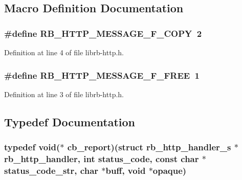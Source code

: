 \subsection{Macro Definition Documentation}
\hypertarget{librb-http_8h_a0ffdecd586e5dc8f1eeede6bac9bc19f}{
\subsubsection[{R\-B\-\_\-\-H\-T\-T\-P\-\_\-\-M\-E\-S\-S\-A\-G\-E\-\_\-\-F\-\_\-\-C\-O\-P\-Y}]{\setlength{\rightskip}{0pt plus 5cm}\#define R\-B\-\_\-\-H\-T\-T\-P\-\_\-\-M\-E\-S\-S\-A\-G\-E\-\_\-\-F\-\_\-\-C\-O\-P\-Y~2}}\label{librb-http_8h_a0ffdecd586e5dc8f1eeede6bac9bc19f}


Definition at line 4 of file librb-\/http.\-h.

\hypertarget{librb-http_8h_aef79f44f520e54cbedce1068fe324720}{
\subsubsection[{R\-B\-\_\-\-H\-T\-T\-P\-\_\-\-M\-E\-S\-S\-A\-G\-E\-\_\-\-F\-\_\-\-F\-R\-E\-E}]{\setlength{\rightskip}{0pt plus 5cm}\#define R\-B\-\_\-\-H\-T\-T\-P\-\_\-\-M\-E\-S\-S\-A\-G\-E\-\_\-\-F\-\_\-\-F\-R\-E\-E~1}}\label{librb-http_8h_aef79f44f520e54cbedce1068fe324720}


Definition at line 3 of file librb-\/http.\-h.



\subsection{Typedef Documentation}
\hypertarget{librb-http_8h_a04bb44224e2874cbf2df16042f2a4c53}{
\subsubsection[{cb\-\_\-report}]{\setlength{\rightskip}{0pt plus 5cm}typedef void($\ast$ cb\-\_\-report)(struct {\bf rb\-\_\-http\-\_\-handler\-\_\-s} $\ast${\bf rb\-\_\-http\-\_\-handler}, int status\-\_\-code, const char $\ast$status\-\_\-code\-\_\-str, char $\ast$buff, void $\ast$opaque)}}\label{librb-http_8h_a04bb44224e2874cbf2df16042f2a4c53}


